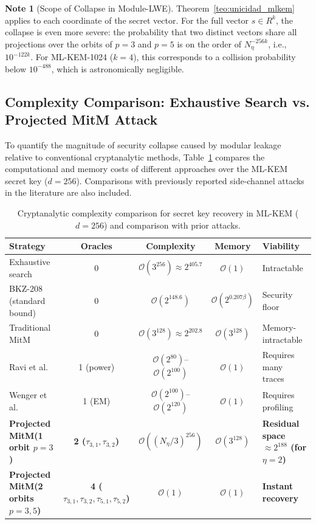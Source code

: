 \documentclass[11pt,a4paper]{article}
\theoremstyle{plain}
\theoremstyle{definition}
\newtheorem{remark}[teorema]{Note}
\numberwithin{equation}{section}
\newcommand{\cO}{\mathcal{O}}
\begin{document}
\begin{remark}[Scope of Collapse in Module-LWE]
\label{rem:alcance_module_lwe}
Theorem~\ref{teo:unicidad_mlkem} applies to each coordinate of the secret vector. For the full vector $s \in R^k$, the collapse is even more severe: the probability that two distinct vectors share all projections over the orbits of $p=3$ and $p=5$ is on the order of $N_\eta^{-256k}$, i.e., $10^{-122k}$. For ML-KEM-1024 ($k=4$), this corresponds to a collision probability below $10^{-488}$, which is astronomically negligible.
\end{remark}

\subsection{Complexity Comparison: Exhaustive Search vs. Projected MitM Attack}
\label{subsec:comparativa_complejidad}

To quantify the magnitude of security collapse caused by modular leakage relative to conventional cryptanalytic methods, Table~\ref{tab:comparativa_complejidad} compares the computational and memory costs of different approaches over the ML-KEM secret key ($d=256$). Comparisons with previously reported side-channel attacks in the literature are also included.

\begin{table}[htbp]
\centering
\caption{Cryptanalytic complexity comparison for secret key recovery in ML-KEM ($d=256$) and comparison with prior attacks.}
\label{tab:comparativa_complejidad}
\small
\setlength{\tabcolsep}{3.5pt}
\begin{tabularx}{\textwidth}{@{} >{\raggedright\arraybackslash}p{3.5cm} c c c >{\raggedright\arraybackslash}X @{}}
\toprule
\textbf{Strategy} & \textbf{Oracles} & \textbf{Complexity} & \textbf{Memory} & \textbf{Viability} \\
\midrule
Exhaustive search & 0 & $\cO(3^{256}) \approx 2^{405.7}$ & $\cO(1)$ & Intractable \\
BKZ-208 (standard bound) & 0 & $\cO(2^{148.6})$ & $\cO(2^{0.207\beta})$ & Security floor \\
Traditional MitM & 0 & $\cO(3^{128}) \approx 2^{202.8}$ & $\cO(3^{128})$ & Memory-intractable \\
Ravi et al. \cite{Ravi2020} & 1 (power) & $\cO(2^{80})$--$\cO(2^{100})$ & $\cO(1)$ & Requires many traces \\
Wenger et al. \cite{Wenger2024} & 1 (EM) & $\cO(2^{100})$--$\cO(2^{120})$ & $\cO(1)$ & Requires profiling \\
\hline
\textbf{Projected MitM\newline(1 orbit $p=3$)} & \textbf{2 ($\tau_{3,1}, \tau_{3,2}$)} & \textbf{$\cO((N_\eta/3)^{256})$} & \textbf{$\cO(3^{128})$} & \textbf{Residual space $\approx 2^{188}$ (for $\eta=2$)} \\
\textbf{Projected MitM\newline(2 orbits $p=3,5$)} & \textbf{4 ($\tau_{3,1}, \tau_{3,2}, \tau_{5,1}, \tau_{5,2}$)} & \textbf{$\cO(1)$} & \textbf{$\cO(1)$} & \textbf{Instant recovery} \\
\bottomrule
\end{tabularx}
\end{table}
\end{document}
